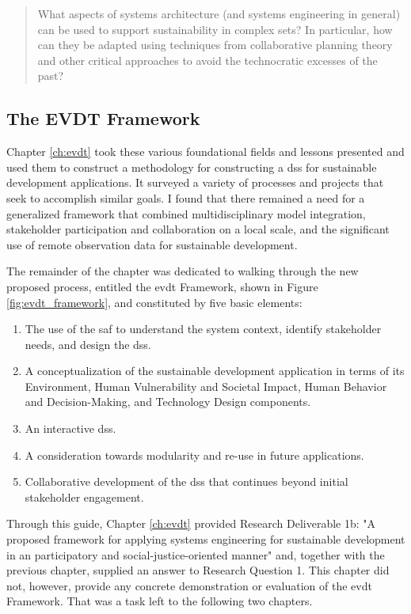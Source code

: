 \blockquote{What aspects of systems architecture (and systems engineering in general) can be used to support sustainability in complex \ac{sets}? In particular, how can they be adapted using techniques from collaborative planning theory and other critical approaches to avoid the technocratic excesses of the past?}

\subsection{The EVDT Framework}

Chapter \ref{ch:evdt} took these various foundational fields and lessons presented and used them to construct a methodology for constructing a \ac{dss} for sustainable development applications. It surveyed a variety of processes and projects that seek to accomplish similar goals. I found that there remained a need for a generalized framework that combined multidisciplinary model integration, stakeholder participation and collaboration on a local scale, and the significant use of remote observation data for sustainable development.

The remainder of the chapter was dedicated to walking through the new proposed process, entitled the \ac{evdt} Framework, shown in Figure \ref{fig:evdt_framework}, and constituted by five basic elements:

\begin{enumerate}[label=\emph{\Alph*)},itemsep=0pt,parsep=0pt]
	\item{The use of the \acf{saf} to understand the system context, identify stakeholder needs, and design the \ac{dss}.}
	\item{A conceptualization of the sustainable development application in terms of its Environment, Human Vulnerability and Societal Impact, Human Behavior and Decision-Making, and Technology Design components.}
	\item{An interactive \ac{dss}.}
	\item{A consideration towards modularity and re-use in future applications.}
	\item{Collaborative development of the \ac{dss} that continues beyond initial stakeholder engagement.}
\end{enumerate}

Through this guide, Chapter \ref{ch:evdt} provided Research Deliverable 1b: "A proposed framework for applying systems engineering for sustainable development in an participatory and social-justice-oriented manner" and, together with the previous chapter, supplied an answer to Research Question 1. This chapter did not, however, provide any concrete demonstration or evaluation of the \ac{evdt} Framework. That was a task left to the following two chapters.

